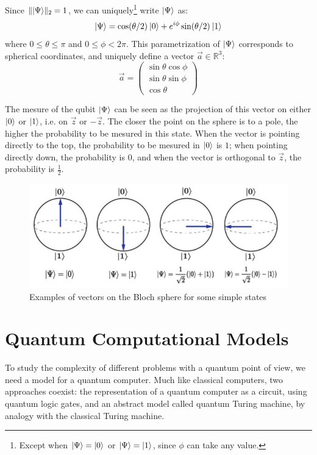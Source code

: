 \documentclass[12pt,a4paper]{article}
\theoremstyle{plain}
\theoremstyle{definition}
\DeclarePairedDelimiter\ket{\lvert}{\rangle}
\begin{document}
Since $\|\ket{\Psi}\|_2=1$, we can uniquely\footnote{Except when $\ket{\Psi}=\ket{0}$ or $\ket{\Psi}=\ket{1}$, since $\phi$ can take any value.} write $\ket{\Psi}$ as:
\begin{equation*}
    \ket{\Psi}=\cos(\theta/2)\:\ket{0} + e^{i\phi}\sin(\theta/2)\: \ket{1}
\end{equation*}
where $0\leq\theta\leq\pi$ and $0\leq\phi<2\pi$. This parametrization of $\ket{\Psi}$ corresponds to spherical coordinates, and uniquely define a vector $\vec{a}\in\mathbb{R}^3$:
\begin{equation*}
    \vec{a}=\begin{pmatrix}\sin\theta\cos\phi\\\sin\theta\sin\phi\\\cos\theta\end{pmatrix}
\end{equation*}

The mesure of the qubit $\ket{\Psi}$ can be seen as the projection of this vector on either $\ket{0}$ or $\ket{1}$, i.e. on $\vec{z}$ or $-\vec{z}$. The closer the point on the sphere is to a pole, the higher the probability to be mesured in this state. When the vector is pointing directly to the top, the probability to be mesured in $\ket{0}$ is $1$; when pointing directly down, the probability is $0$, and when the vector is orthogonal to $\vec{z}$, the probability is $\frac{1}{2}$.

\begin{figure}[!ht]
    \centering
    \includegraphics*[scale=0.5]{bloch-examples.png}
    \caption{Examples of vectors on the Bloch sphere for some simple states}
\end{figure}

\section{Quantum Computational Models}
To study the complexity of different problems with a quantum point of view, we need a model for a quantum computer. Much like classical computers, two approaches coexist: the representation of a quantum computer as a circuit, using quantum logic gates, and an abstract model called quantum Turing machine, by analogy with the classical Turing machine.
\end{document}

